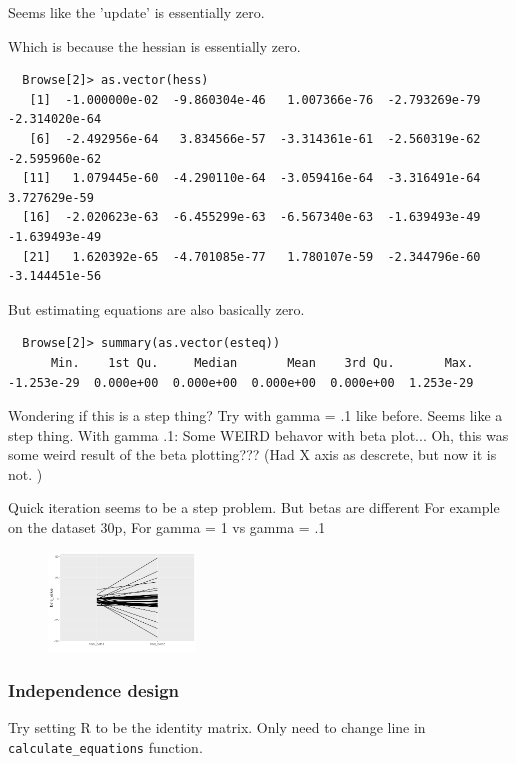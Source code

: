 \documentclass[10pt]{article}
\theoremstyle{definition}
\begin{document}
Seems like the 'update' is essentially zero.

Which is because the hessian is essentially zero.
\begin{verbatim}
  Browse[2]> as.vector(hess)
   [1]  -1.000000e-02  -9.860304e-46   1.007366e-76  -2.793269e-79  -2.314020e-64
   [6]  -2.492956e-64   3.834566e-57  -3.314361e-61  -2.560319e-62  -2.595960e-62
  [11]   1.079445e-60  -4.290110e-64  -3.059416e-64  -3.316491e-64   3.727629e-59
  [16]  -2.020623e-63  -6.455299e-63  -6.567340e-63  -1.639493e-49  -1.639493e-49
  [21]   1.620392e-65  -4.701085e-77   1.780107e-59  -2.344796e-60  -3.144451e-56
\end{verbatim}

But estimating equations are also basically zero.
\begin{verbatim}
  Browse[2]> summary(as.vector(esteq))
      Min.    1st Qu.     Median       Mean    3rd Qu.       Max.
-1.253e-29  0.000e+00  0.000e+00  0.000e+00  0.000e+00  1.253e-29
\end{verbatim}

Wondering if this is a step thing? Try with gamma = .1 like before. Seems like a step thing.
With gamma .1:
Some WEIRD behavor with beta plot... Oh, this was some weird result of the beta plotting??? (Had X axis as descrete, but now it is not. )

Quick iteration seems to be a step problem.
But betas are different
For example on the dataset 30p, For gamma = 1 vs gamma = .1

\begin{figure}[!htb]
	\centering
	\includegraphics[width=0.35\textwidth]{img/Temp_week_journal-9d4b1490.png}
	\caption{}
	\label{}
\end{figure}




\subsubsection{Independence design}

Try setting R to be the identity matrix.
Only need to change line in \texttt{calculate\_equations} function.
\end{document}
